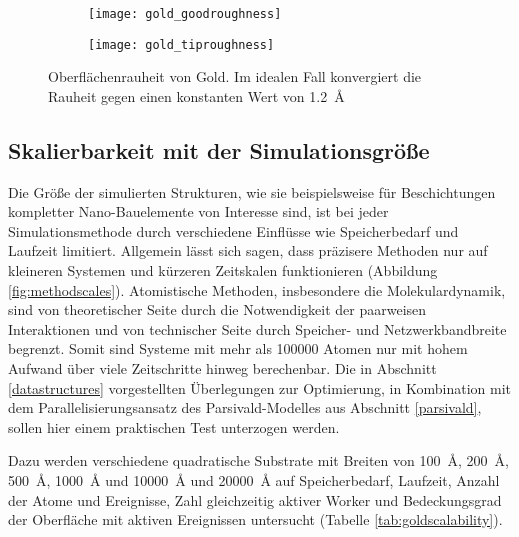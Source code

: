 \begin{figure}
  \captionsetup[subfigure]{singlelinecheck=false}
  \def\subfigwidth{0.49\textwidth}

  \begin{subfigure}[t]{\subfigwidth}
    \texttt{[image: gold\_goodroughness]}
    \label{fig:goldroughness-a}
  \end{subfigure}
  \hfill
  \begin{subfigure}[t]{\subfigwidth}
    \texttt{[image: gold\_tiproughness]}
    \label{fig:goldroughness-b}
  \end{subfigure}

  \caption[Oberflächenrauheit von Gold]{Oberflächenrauheit von Gold.
    Im idealen Fall konvergiert die Rauheit gegen einen konstanten Wert von \SI{1.2}{\angstrom}
  }
  \label{fig:goldroughness}

\end{figure}

\subsection{Skalierbarkeit mit der Simulationsgröße}

Die Größe der simulierten Strukturen, wie sie beispielsweise für Beschichtungen kompletter Nano-Bauelemente von Interesse sind, ist bei jeder Simulationsmethode durch verschiedene Einflüsse wie Speicherbedarf und Laufzeit limitiert.
Allgemein lässt sich sagen, dass präzisere Methoden nur auf kleineren Systemen und kürzeren Zeitskalen funktionieren (Abbildung \ref{fig:methodscales}).
Atomistische Methoden, insbesondere die Molekulardynamik, sind von theoretischer Seite durch die Notwendigkeit der paarweisen Interaktionen und von technischer Seite durch Speicher- und Netzwerkbandbreite begrenzt.
Somit sind Systeme mit mehr als \num{100000} Atomen nur mit hohem Aufwand über viele Zeitschritte hinweg berechenbar.
Die in Abschnitt \ref{datastructures} vorgestellten Überlegungen zur Optimierung, in Kombination mit dem Parallelisierungsansatz des Parsivald-Modelles aus Abschnitt \ref{parsivald}, sollen hier einem praktischen Test unterzogen werden.

Dazu werden verschiedene quadratische Substrate mit Breiten von \SI{100}{\angstrom}, \SI{200}{\angstrom}, \SI{500}{\angstrom}, \SI{1000}{\angstrom} und \SI{10000}{\angstrom} und \SI{20000}{\angstrom} auf Speicherbedarf, Laufzeit, Anzahl der Atome und Ereignisse, Zahl gleichzeitig aktiver Worker und Bedeckungsgrad der Oberfläche mit aktiven Ereignissen untersucht (Tabelle \ref{tab:goldscalability}).

